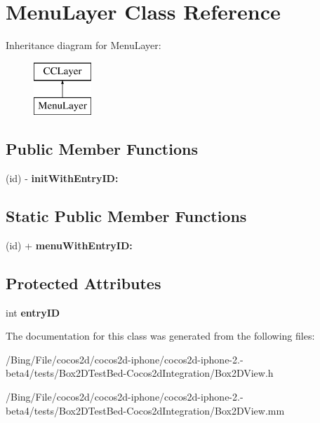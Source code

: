 \hypertarget{interface_menu_layer}{\section{Menu\-Layer Class Reference}
\label{interface_menu_layer}
}
Inheritance diagram for Menu\-Layer\-:\begin{figure}[H]
\begin{center}
\leavevmode
\includegraphics[height=2.000000cm]{interface_menu_layer}
\end{center}
\end{figure}
\subsection*{Public Member Functions}
\begin{DoxyCompactItemize}
\item 
\hypertarget{interface_menu_layer_acc5fa093df00c4c073ee155236962728}{(id) -\/ {\bfseries init\-With\-Entry\-I\-D\-:}}\label{interface_menu_layer_acc5fa093df00c4c073ee155236962728}

\end{DoxyCompactItemize}
\subsection*{Static Public Member Functions}
\begin{DoxyCompactItemize}
\item 
\hypertarget{interface_menu_layer_a5dc1c2e27b1a33fae35f503c0fcd1d80}{(id) + {\bfseries menu\-With\-Entry\-I\-D\-:}}\label{interface_menu_layer_a5dc1c2e27b1a33fae35f503c0fcd1d80}

\end{DoxyCompactItemize}
\subsection*{Protected Attributes}
\begin{DoxyCompactItemize}
\item 
\hypertarget{interface_menu_layer_aa084e80ce6be8be93dfac5dd0c062945}{int {\bfseries entry\-I\-D}}\label{interface_menu_layer_aa084e80ce6be8be93dfac5dd0c062945}

\end{DoxyCompactItemize}


The documentation for this class was generated from the following files\-:\begin{DoxyCompactItemize}
\item 
/\-Bing/\-File/cocos2d/cocos2d-\/iphone/cocos2d-\/iphone-\/2.-\/beta4/tests/\-Box2\-D\-Test\-Bed-\/\-Cocos2d\-Integration/Box2\-D\-View.\-h\item 
/\-Bing/\-File/cocos2d/cocos2d-\/iphone/cocos2d-\/iphone-\/2.-\/beta4/tests/\-Box2\-D\-Test\-Bed-\/\-Cocos2d\-Integration/Box2\-D\-View.\-mm\end{DoxyCompactItemize}
